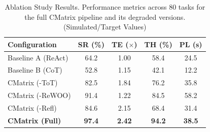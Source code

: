 
\begin{table}[htbp]
  \centering
  \caption{Ablation Study Results. Performance metrics across 80 tasks for the full CMatrix pipeline and its degraded versions. (Simulated/Target Values)}
  \label{tab:ablation-results}
  \begin{tabular}{lcccc}
    \toprule
    \textbf{Configuration} & \textbf{SR (\%)} & \textbf{TE ($\times$)} & \textbf{TH (\%)} & \textbf{PL (s)} \\
    \midrule
    Baseline A (ReAct) & 64.2 & 1.00 & 58.4 & 24.5 \\
    Baseline B (CoT) & 52.8 & 1.15 & 42.1 & 12.2 \\
    \midrule
    CMatrix (-ToT) & 82.5 & 1.84 & 76.2 & 35.8 \\
    CMatrix (-ReWOO) & 91.4 & 1.22 & 84.5 & 58.2 \\
    CMatrix (-Refl) & 84.6 & 2.15 & 68.4 & 31.4 \\
    \midrule
    \textbf{CMatrix (Full)} & \textbf{97.4} & \textbf{2.42} & \textbf{94.2} & \textbf{38.5} \\
    \bottomrule
  \end{tabular}
\end{table}
